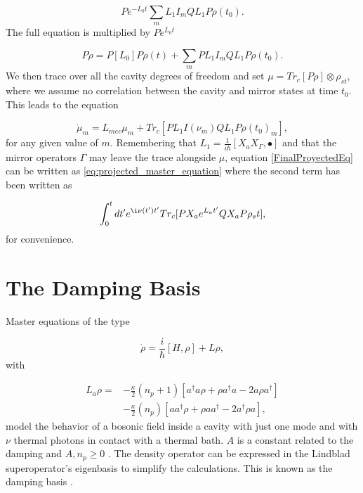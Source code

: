 \documentclass[reprint, amsmath,amssymb, aps,pra]{revtex4-1}
\begin{document}
\begin{equation}
Pe^{-L_0 t} \sum_{m} L_1 I_{m} Q L_1 P \rho(t_0).
\end{equation} The full equation is multiplied by $Pe^{L_0 t}$ 

\begin{equation}
P\dot{\rho} = P[L_0]P \rho(t) + \sum_{m} P L_1 I_{m} Q L_1 P \rho(t_0).
\end{equation} We then trace over all the cavity degrees of freedom and set  $\mu = Tr_c[P\rho]\otimes \rho_{st}$, where we assume no correlation between the cavity and mirror states at time $t_0$. This leads to the equation

\begin{equation}\label{FinalProyectedEq}
\dot{\mu}_m = L_{mec}\mu_m + Tr_c[ P L_1 I(\nu_m) Q L_1 P \rho(t_0)_m],
\end{equation} for any given value of $m$. Remembering that $L_1 = \frac{1}{i\hbar}[X_a X_\Gamma,\bullet]$ and that the mirror operators $\Gamma$ may leave the trace alongside $\mu$, equation \eqref{FinalProyectedEq} can be written as \eqref{eq:projected_master_equation} where the second term has been written as

\begin{equation}
\int_0^tdt' e^{\i\nu(t')t'}Tr_c[ P X_a e^{L_a t'} Q X_a P \rho_st], 
\end{equation} for convenience.


\section{The Damping Basis}\label{App1}

Master equations of the type 

\begin{equation}
\dot{\rho} = \frac{i}{\hbar}[H,\rho]+L\rho, 
\end{equation} with

\begin{align}\label{EMField}
L_a \rho =& - \frac{\kappa}{2}(n_p+1)[a^\dagger a\rho + \rho a^\dagger a -2a\rho a^\dagger] \nonumber \\
 &- \frac{\kappa}{2}(n_p)[ aa^\dagger\rho + \rho  aa^\dagger -2a^\dagger\rho a],
\end{align} model the behavior of a bosonic field inside a cavity with just one mode and with $\nu$ thermal photons in contact with a thermal bath. $A$ is a constant related to the damping and $A,n_p \geq 0$  \cite{EnglertDB}. The density operator can be expressed in the Lindblad superoperator's eigenbasis to simplify the calculations. This is known as the damping basis \cite{EnglertDB}.
\end{document}
